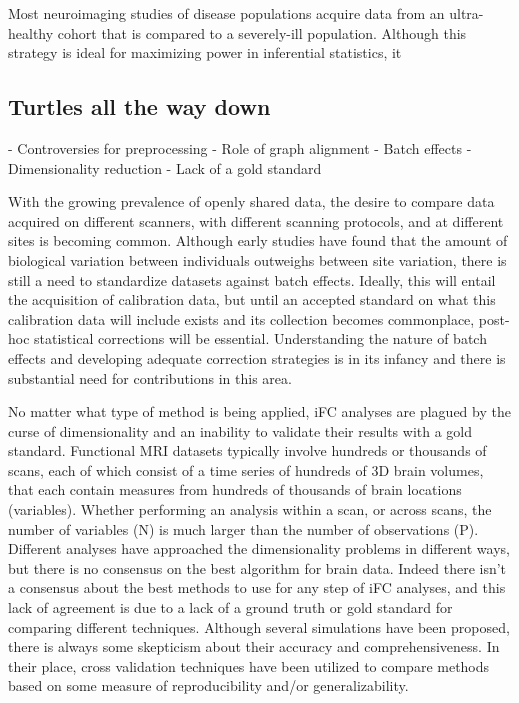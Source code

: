 Most neuroimaging studies of disease populations acquire data from an ultra-healthy cohort that is compared to
a severely-ill population. Although this strategy is ideal for maximizing power in inferential statistics, it 

\subsection{Turtles all the way down}

- Controversies for preprocessing
- Role of graph alignment
- Batch effects
- Dimensionality reduction
- Lack of a gold standard

With the growing prevalence of openly shared data, the desire to compare data
acquired on different scanners, with different scanning protocols, and at
different sites is becoming common. Although early studies have found that the
amount of biological variation between individuals outweighs between site
variation\cite{biswal}, there is still a need to standardize datasets against
batch effects\cite{YanStand}. Ideally, this will entail the acquisition of
calibration data, but until an accepted standard on what this calibration data
will include exists and its collection becomes commonplace, post-hoc
statistical corrections will be essential. Understanding the nature of batch
effects and developing adequate correction strategies is in its infancy and
there is substantial need for contributions in this area.  

No matter what type of method is being applied, iFC analyses are plagued by the
curse of dimensionality and an inability to validate their results with a gold
standard. Functional MRI datasets typically involve hundreds or thousands of
scans, each of which consist of a time series of hundreds of 3D brain volumes,
that each contain measures from hundreds of thousands of brain locations
(variables). Whether performing an analysis within a scan, or across scans, the
number of variables (N) is much larger than the number of observations (P).
Different analyses have approached the dimensionality problems in different
ways, but there is no consensus on the best algorithm for brain data. Indeed
there isn't a consensus about the best methods to use for any step of iFC
analyses, and this lack of agreement is due to a lack of a ground truth or gold
standard for comparing different techniques. Although several simulations have
been proposed, there is always some skepticism about their accuracy and
comprehensiveness. In their place, cross validation techniques have been
utilized to compare methods based on some measure of reproducibility and/or
generalizability.


